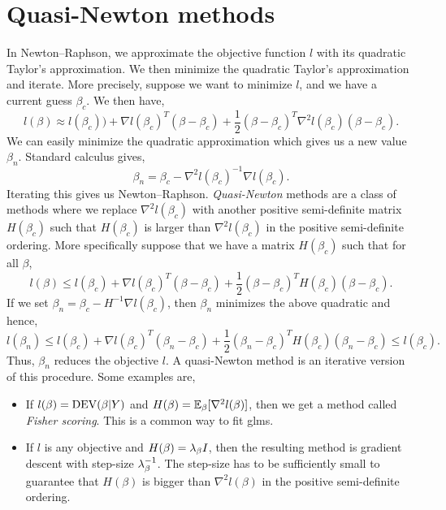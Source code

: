 \section{Quasi-Newton methods}
In Newton--Raphson, we approximate the objective function $l$ with its quadratic Taylor's approximation. We then minimize the quadratic Taylor's approximation and iterate. More precisely, suppose we want  to minimize $l$, and we have a  current  guess $\beta_c$. We then  have,
\[l(\beta) \approx l(\beta_c))+\nabla l(\beta_c)^T(\beta-\beta_c)+\frac{1}{2}(\beta-\beta_c)^T\nabla^2 l(\beta_c)(\beta-\beta_c). \]
We can  easily minimize the  quadratic approximation  which gives us a new value $\beta_n$. Standard calculus gives,
\[\beta_n = \beta_c - \nabla^2l(\beta_c)^{-1}\nabla l(\beta_c). \]
Iterating this gives us Newton--Raphson. \emph{Quasi-Newton} methods are a class of methods where we replace $\nabla^2l(\beta_c)$  with another positive semi-definite matrix $H(\beta_c)$ such that $H(\beta_c)$ is larger than $\nabla^2 l(\beta_c)$ in the positive semi-definite ordering. More specifically suppose that we have a matrix $H(\beta_c)$ such that for all $\beta$,
\[l(\beta) \le l(\beta_c)+\nabla l(\beta_c)^T(\beta-\beta_c)+\frac{1}{2}(\beta-\beta_c)^TH(\beta_c)(\beta-\beta_c). \]
If we set $\beta_n = \beta_c-H^{-1}\nabla l(\beta_c)$, then $\beta_n$ minimizes the above quadratic and hence,
\[l(\beta_n) \le l(\beta_c)+\nabla l(\beta_c)^T(\beta_n-\beta_c)+\frac{1}{2}(\beta_n-\beta_c)^TH(\beta_c)(\beta_n-\beta_c) \le   l(\beta_c). \]
Thus, $\beta_n$ reduces the objective  $l$. A quasi-Newton method is an iterative   version of this procedure. Some examples are,
\begin{itemize}
    \item If $l(\beta)=\operatorname{DEV}(\beta|Y)$ and $H(\beta) = {\mathbb{E}}_\beta[\nabla^2 l(\beta)]$, then we get a method called \emph{Fisher scoring}. This is a common way to fit glms.
    \item If $l$ is any objective and $H(\beta) = \lambda_\beta I$, then the resulting method is gradient descent with step-size $\lambda_\beta^{-1}$. The step-size has to be sufficiently small to guarantee that $H(\beta)$ is bigger than $\nabla^2 l(\beta)$ in the positive semi-definite ordering.
\end{itemize}


